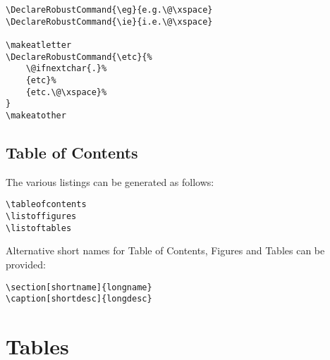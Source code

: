 \documentclass{article}
\makeatletter
\DeclareRobustCommand{\eg}{e.g.\@\xspace}
\DeclareRobustCommand{\ie}{i.e.\@\xspace}
\DeclareRobustCommand{\etc}{%
    \@ifnextchar{.}%
    {etc}%
    {etc.\@\xspace}%
}
\makeatother
\begin{document}
\begin{lstlisting}[language={[LaTeX]TeX}, caption={Useful headers.}]
\DeclareRobustCommand{\eg}{e.g.\@\xspace}
\DeclareRobustCommand{\ie}{i.e.\@\xspace}

\makeatletter
\DeclareRobustCommand{\etc}{%
   	\@ifnextchar{.}%
   	{etc}%
   	{etc.\@\xspace}%
}
\makeatother
\end{lstlisting}


\subsection{Table of Contents}
\label{subsec: Table of Contents}

The various listings can be generated as follows:
\begin{lstlisting}[language={[LaTeX]TeX}, caption={Various listings of content.}]
\tableofcontents
\listoffigures
\listoftables
\end{lstlisting}

Alternative short names for Table of Contents, Figures and Tables can be provided:

\begin{lstlisting}[language={[LaTeX]TeX}, caption={Alternative short names.}]
\section[shortname]{longname}
\caption[shortdesc]{longdesc}
\end{lstlisting}


\section{Tables}
\label{sec: Tables}
\end{document}
